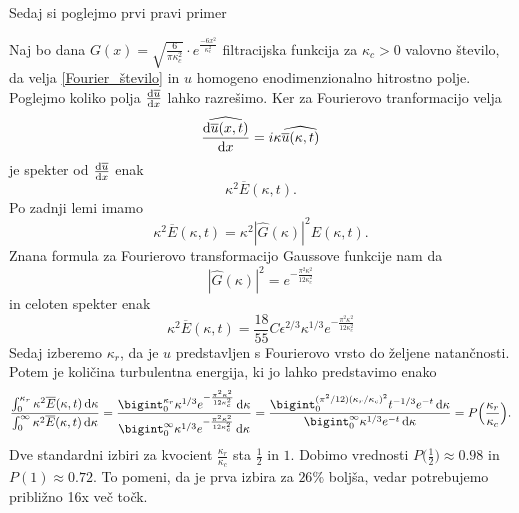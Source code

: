 \documentclass[mat2, tisk]{fmfdelo}
\begin{document}
Sedaj si poglejmo prvi pravi primer 
\begin{primer}
Naj bo dana $G(x) = \sqrt{\frac{6}{\pi \kappa_c^2}}\cdot e^\frac{-6x^2}{\kappa_c^2}$ filtracijska funkcija 
za $\kappa_c > 0$ valovno število, da velja \ref{Fourier_število} in $u$ homogeno enodimenzionalno hitrostno polje. Poglejmo koliko polja $\frac{\dif \overline{u}}{\dif x}$
lahko razrešimo. Ker za Fourierovo tranformacijo velja
$$
\widehat{\frac{\dif \overline{u}(x, t)}{\dif x}} = i\kappa \widehat{\overline{u}(\kappa, t)}
$$
je spekter od $\frac{\dif \overline{u}}{\dif x}$ enak 
$$
\kappa^2 \overline{E}(\kappa, t).
$$
Po zadnji lemi imamo 
$$
\kappa^2 \overline{E}(\kappa, t) = \kappa^2 |\hat{G}(\kappa)|^2 E(\kappa, t).
$$
Znana formula za Fourierovo transformacijo Gaussove funkcije nam da
$$
|\hat{G}(\kappa)|^2 = e^{-\frac{\pi^2 \kappa^2}{12\kappa_c^2}}
$$
in celoten spekter enak 
$$
\kappa^2 \overline{E}(\kappa, t) = \frac{18}{55} C\epsilon^{2/3} \kappa^{1/3} e^{-\frac{\pi^2 \kappa^2}{12\kappa_c^2}}
$$
Sedaj izberemo $\kappa_r$, da je $u$ predstavljen s Fourierovo vrsto 
do željene natančnosti. Potem je količina turbulentna energija, ki jo lahko 
predstavimo enako 
\begin{align*}
\frac{\int_{0}^{\kappa_r} \kappa^2 \overline{E}(\kappa, t)\dif \kappa}{\int_{0}^{\infty} \kappa^2 \overline{E}(\kappa, t)\dif \kappa} = \frac{\bigint_0^{\kappa_r} \kappa^{1/3} e^{-\frac{\pi^2 \kappa^2}{12\kappa_c^2}}\dif \kappa}{\bigint_{0}^{\infty} \kappa^{1/3} e^{-\frac{\pi^2 \kappa^2}{12\kappa_c^2}}\dif \kappa} = 
\frac{\bigint_0^{(\pi^2/12)(\kappa_r/\kappa_c)^2} t^{-1/3} e^{-t}\dif \kappa}{\bigint_{0}^{\infty} \kappa^{1/3} e^{-t}\dif \kappa} = P\Big(\frac{\kappa_r}{\kappa_c}\Big).
\end{align*}
Dve standardni izbiri za kvocient $\frac{\kappa_r}{\kappa_c}$ sta $\frac{1}{2}$ in $1$.
Dobimo vrednosti $P\Big(\frac{1}{2}\Big) \approx 0.98$ in 
$P(1) \approx 0.72$. To pomeni, da je prva izbira za $26\%$ boljša, 
vedar potrebujemo približno 16x več točk.
\end{primer}
\end{document}
